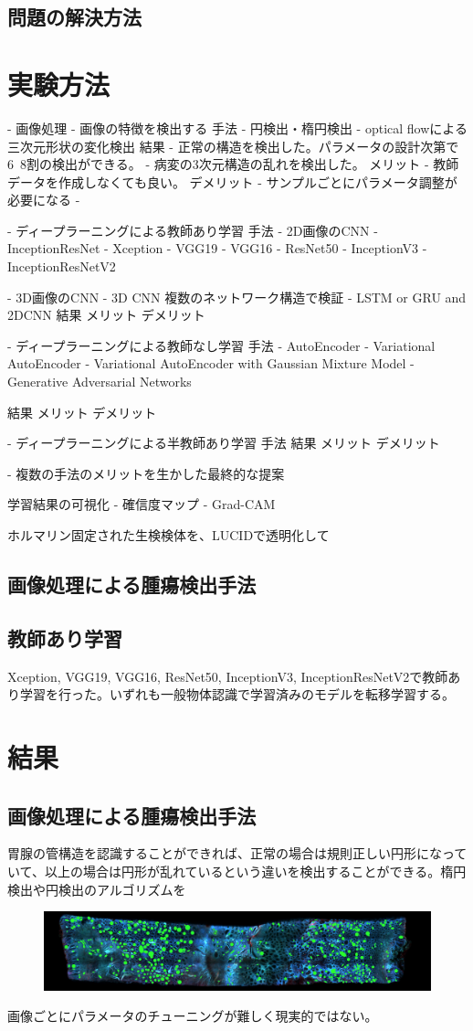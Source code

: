 \documentclass[a4j,10pt,oneside,openany]{jsbook}
\begin{document}
\section{問題の解決方法}
\chapter{実験方法}
- 画像処理
    - 画像の特徴を検出する
手法
    - 円検出・楕円検出
    - optical flowによる三次元形状の変化検出
 結果
     - 正常の構造を検出した。パラメータの設計次第で6~8割の検出ができる。
     - 病変の3次元構造の乱れを検出した。
メリット
    - 教師データを作成しなくても良い。
デメリット
    - サンプルごとにパラメータ調整が必要になる
    - 
 

- ディープラーニングによる教師あり学習
手法
    - 2D画像のCNN
        - InceptionResNet
        - Xception
        - VGG19
        - VGG16
        - ResNet50
        - InceptionV3
        - InceptionResNetV2
        
    - 3D画像のCNN
        - 3D CNN 複数のネットワーク構造で検証
        - LSTM or GRU and 2DCNN
結果
メリット
デメリット

- ディープラーニングによる教師なし学習
手法
    - AutoEncoder
    - Variational AutoEncoder
    - Variational AutoEncoder with Gaussian Mixture Model
    - Generative Adversarial Networks
    
結果
メリット
デメリット

- ディープラーニングによる半教師あり学習
手法
結果
メリット
デメリット

- 複数の手法のメリットを生かした最終的な提案

学習結果の可視化
- 確信度マップ
- Grad-CAM

ホルマリン固定された生検検体を、LUCIDで透明化して

\section{画像処理による腫瘍検出手法}

\section{教師あり学習}
Xception, VGG19, VGG16, ResNet50, InceptionV3, InceptionResNetV2で教師あり学習を行った。いずれも一般物体認識で学習済みのモデルを転移学習する。

\chapter{結果}
\section{画像処理による腫瘍検出手法}
胃腺の管構造を認識することができれば、正常の場合は規則正しい円形になっていて、以上の場合は円形が乱れているという違いを検出することができる。楕円検出や円検出のアルゴリズムを
\begin{figure}[h]
\includegraphics[width=15cm]{img/eclips_low.png}
\end{figure}
画像ごとにパラメータのチューニングが難しく現実的ではない。
\end{document}
